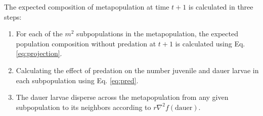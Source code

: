 \documentclass[10pt,letterpaper]{article}
\begin{document}
The expected composition of metapopulation at time $t+1$ is calculated in three steps:

\begin{enumerate}
    \item For each of the $m^2$ subpopulations in the metapopulation, the  expected population composition without predation at $t+1$ is calculated using Eq. \ref{eq:projection}.

    \item Calculating the effect of predation on the number juvenile and dauer larvae in each subpopulation using Eq. \ref{eq:pred}.

    \item The dauer larvae disperse across the metapopulation from any given subpopulation to its neighbors according to $r \nabla^2 f(\mathrm{dauer})$. 
\end{enumerate}



\end{document}
